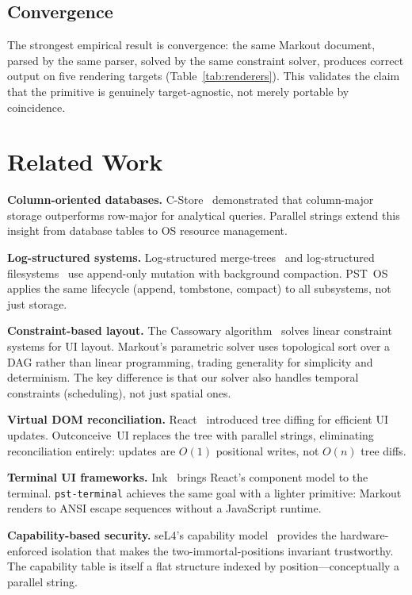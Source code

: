 \documentclass[11pt,a4paper]{article}
\begin{document}
\subsection{Convergence}

The strongest empirical result is convergence: the same Markout document, parsed by the same parser, solved by the same constraint solver, produces correct output on five rendering targets (Table~\ref{tab:renderers}). This validates the claim that the primitive is genuinely target-agnostic, not merely portable by coincidence.

\section{Related Work}
\label{sec:related}

\textbf{Column-oriented databases.} C-Store~\citep{columnstore} demonstrated that column-major storage outperforms row-major for analytical queries. Parallel strings extend this insight from database tables to OS resource management.

\textbf{Log-structured systems.} Log-structured merge-trees~\citep{lsm} and log-structured filesystems~\citep{lfs} use append-only mutation with background compaction. PST~OS applies the same lifecycle (append, tombstone, compact) to all subsystems, not just storage.

\textbf{Constraint-based layout.} The Cassowary algorithm~\citep{cassowary} solves linear constraint systems for UI layout. Markout's parametric solver uses topological sort over a DAG rather than linear programming, trading generality for simplicity and determinism. The key difference is that our solver also handles temporal constraints (scheduling), not just spatial ones.

\textbf{Virtual DOM reconciliation.} React~\citep{react} introduced tree diffing for efficient UI updates. Outconceive~UI replaces the tree with parallel strings, eliminating reconciliation entirely: updates are $O(1)$ positional writes, not $O(n)$ tree diffs.

\textbf{Terminal UI frameworks.} Ink~\citep{ink} brings React's component model to the terminal. \texttt{pst-terminal} achieves the same goal with a lighter primitive: Markout renders to ANSI escape sequences without a JavaScript runtime.

\textbf{Capability-based security.} seL4's capability model~\citep{sel4, capability} provides the hardware-enforced isolation that makes the two-immortal-positions invariant trustworthy. The capability table is itself a flat structure indexed by position---conceptually a parallel string.
\end{document}
